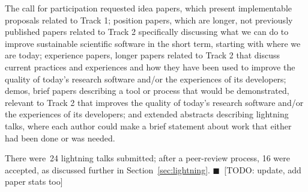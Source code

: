 \documentclass[11pt, oneside]{amsart}
\newcommand{\todo}[1]{{\color{blue}$\blacksquare$~\textsf{[TODO: #1]}}}
\begin{document}
The call for participation requested
idea papers, which present implementable proposals related to Track 1;
position papers, which are longer, not previously published papers related to
Track 2 specifically discussing what we can do to improve sustainable scientific
software in the short term, starting with where we are today;
experience papers, longer papers related to Track 2 that discuss current
practices and experiences and how they have been used to improve the quality of
today's research software and/or the experiences of its developers;
demos, brief papers describing a tool or
process that would be demonstrated, relevant to Track 2 that improves the quality of today's research
software and\slash or the experiences of its developers; and
extended abstracts describing lightning talks,
where each author could make a brief statement about work that either had been
done or was needed.

There were~24 lightning talks submitted; after a peer-review process, 16
were accepted, as discussed further in Section~\ref{sec:lightning}.
\todo{update, add paper stats too}
\end{document}
